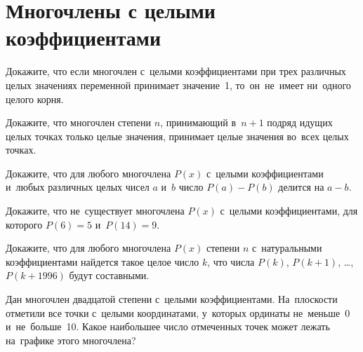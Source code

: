 

\section*{Многочлены с целыми коэффициентами}


\begin{problems}

\item
Докажите, что если многочлен с~целыми коэффициентами при трех различных целых
значениях переменной принимает значение~1, то~он~не~имеет ни~одного целого
корня.

\item
Докажите, что многочлен степени $n$, принимающий в~$n + 1$ подряд идущих целых
точках только целые значения, принимает целые значения во~всех целых точках.

\item
Докажите, что для любого многочлена $P(x)$ с~целыми коэффициентами и~любых
различных целых чисел $a$ и~$b$ число $P(a) - P(b)$ делится на $a - b$.

\item
Докажите, что не~существует многочлена $P(x)$ с~целыми коэффициентами, для
которого $P(6) = 5$ и~$P(14) = 9$.

\item
Докажите, что для любого многочлена $P(x)$ степени $n$ с~натуральными
коэффициентами найдется такое целое число $k$, что числа
$P(k)$, $P(k + 1)$, \ldots, $P(k + 1996)$ будут составными.

\item
Дан многочлен двадцатой степени с~целыми коэффициентами.
На~плоскости отметили все точки с~целыми координатами, у~которых ординаты
не~меньше~0 и~не~больше~10.
Какое наибольшее число отмеченных точек может лежать на~графике этого
многочлена?

\end{problems}

